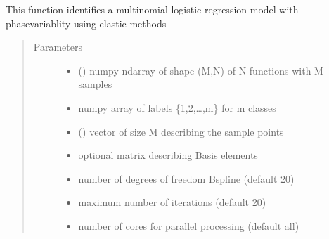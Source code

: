 \documentclass[letterpaper,10pt,english]{sphinxmanual}
\begin{document}
\begin{fulllineitems}
\label{\detokenize{regression:regression.elastic_mlogistic}}
This function identifies a multinomial logistic regression model with
phase\sphinxhyphen{}variablity using elastic methods
\begin{quote}\begin{description}
\item[{Parameters}] \leavevmode\begin{itemize}
\item {} 
 () \textendash{} numpy ndarray of shape (M,N) of N functions with M samples

\item {} 
 \textendash{} numpy array of labels \{1,2,…,m\} for m classes

\item {} 
 () \textendash{} vector of size M describing the sample points

\item {} 
 \textendash{} optional matrix describing Basis elements

\item {} 
 \textendash{} number of degrees of freedom B\sphinxhyphen{}spline (default 20)

\item {} 
 \textendash{} maximum number of iterations (default 20)

\item {} 
 \textendash{} number of cores for parallel processing (default all)


\end{itemize}
\end{description}
\end{quote}
\end{fulllineitems}
\end{document}
